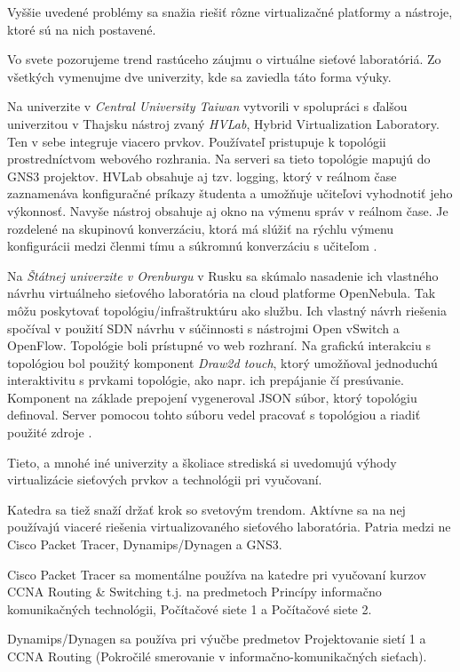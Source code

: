 Vyššie uvedené problémy sa snažia riešiť rôzne virtualizačné platformy a nástroje, ktoré sú na nich postavené.

Vo svete pozorujeme trend rastúceho záujmu o virtuálne sieťové laboratóriá. Zo všetkých vymenujme dve univerzity, kde sa zaviedla táto forma výuky.

Na univerzite v \emph{Central University Taiwan} vytvorili v spolupráci s ďalšou univerzitou v Thajsku nástroj zvaný \emph{HVLab}, Hybrid Virtualization Laboratory. Ten v sebe integruje viacero prvkov. Používateľ pristupuje k topológii prostredníctvom webového rozhrania. Na serveri sa tieto topológie mapujú do GNS3 projektov. HVLab obsahuje aj tzv. logging, ktorý v reálnom čase zaznamenáva konfiguračné príkazy študenta a umožňuje učiteľovi vyhodnotiť jeho výkonnosť. Navyše nástroj obsahuje aj okno na výmenu správ v reálnom čase. Je rozdelené na skupinovú konverzáciu, ktorá má slúžiť na rýchlu výmenu konfigurácii medzi členmi tímu a súkromnú konverzáciu s učiteľom \cite{hvlab}.

Na \emph{Štátnej univerzite v Orenburgu} v Rusku sa skúmalo nasadenie ich vlastného návrhu virtuálneho sieťového laboratória na cloud platforme OpenNebula. Tak môžu poskytovať topológiu/infraštruktúru ako službu. Ich vlastný návrh riešenia spočíval v použití SDN návrhu v súčinnosti s nástrojmi Open vSwitch a OpenFlow. Topológie boli prístupné vo web rozhraní. Na grafickú interakciu s topológiou bol použitý komponent \emph{Draw2d touch}, ktorý umožňoval jednoduchú interaktivitu s prvkami topológie, ako napr. ich prepájanie čí presúvanie. Komponent na základe prepojení vygeneroval JSON súbor, ktorý topológiu definoval. Server pomocou tohto súboru vedel pracovať s topológiou a riadiť použité zdroje \cite{opennebula_lab}.

Tieto, a mnohé iné univerzity a školiace strediská si uvedomujú výhody virtualizácie sieťových prvkov a technológii pri vyučovaní.

Katedra sa tiež snaží držať krok so svetovým trendom. Aktívne sa na nej používajú viaceré riešenia virtualizovaného sieťového laboratória. Patria medzi ne Cisco Packet Tracer, Dynamips/Dynagen a GNS3.

Cisco Packet Tracer sa momentálne používa na katedre pri vyučovaní kurzov CCNA Routing \& Switching t.j. na predmetoch Princípy informačno komunikačných technológii, Počítačové siete 1 a Počítačové siete 2.

Dynamips/Dynagen sa používa pri výučbe predmetov Projektovanie sietí 1 a CCNA Routing (Pokročilé smerovanie v informačno-komunikačných sieťach).

